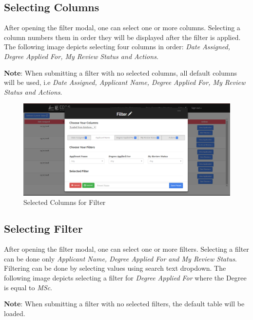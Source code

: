 \documentclass[fontsize=12pt,paper=letter,twoside]{scrartcl}
\begin{document}
\subsection{Selecting Columns}

After opening the filter modal, one can select one or more columns. Selecting a column numbers them in order they will be displayed after the filter is applied. The following image depicts selecting four columns in order: \emph{Date Assigned, Degree Applied For, My Review Status and Actions}.

\bigskip
\noindent \textbf{Note}: When submitting a filter with no selected columns, all default columns will be used, i.e \emph{Date Assigned, Applicant Name, Degree Applied For, My Review Status and Actions}.

\clearpage
\begin{figure}[!htb]
\begin{center}
\includegraphics[width=.9\textwidth]{images/selected_col.png}
\end{center}
\caption{Selected Columns for Filter}
\label{fig:fm_selected_col}
\end{figure}

\subsection{Selecting Filter}

After opening the filter modal, one can select one or more filters. Selecting a filter can be done only \emph{Applicant Name, Degree Applied For and My Review Status}. Filtering can be done by selecting values using search text dropdown. The following image depicts selecting a filter for \emph{Degree Applied For} where the Degree is equal to \emph{MSc}.

\bigskip
\noindent \textbf{Note}: When submitting a filter with no selected filters, the default table will be loaded.
\end{document}
